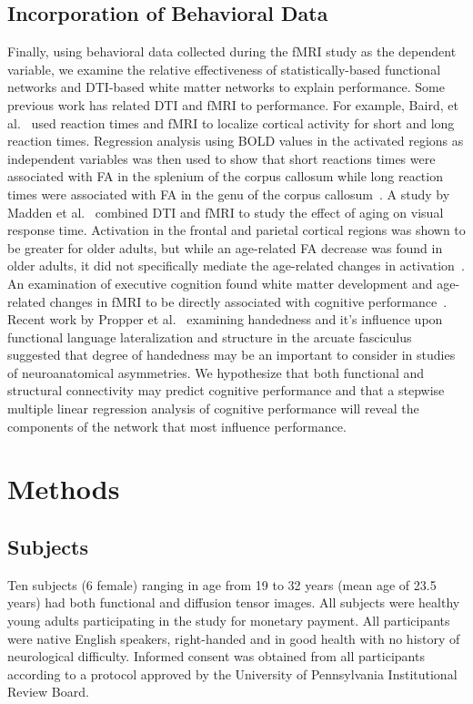 \subsection{Incorporation of Behavioral Data}
Finally, using behavioral data collected during the fMRI study as the dependent variable, we examine the relative effectiveness of statistically-based functional networks and DTI-based white matter networks to explain performance. Some previous work has related DTI and fMRI to performance. For example, Baird, et al.\ \cite{Baird2005} used reaction times and fMRI to localize cortical activity for short and long reaction times. Regression analysis using BOLD values in the activated regions as independent variables was then used to show that short reactions times were associated with FA in the splenium of the corpus callosum while long reaction times were associated with FA in the genu of the corpus callosum~\cite{Baird2005}. A study by Madden et al.\ \cite{Madden2007} combined DTI and fMRI to study the effect of aging on visual response time. Activation in the frontal and parietal cortical regions was shown to be greater for older adults, but while an age-related FA decrease was found in older adults, it did not specifically mediate the age-related changes in activation~\cite{Madden2007}. An examination of executive cognition found white matter development and age-related changes in fMRI to be directly associated with cognitive performance~\cite{Stevens2009}. Recent work by Propper et al.\ \cite{Propper2010} examining handedness and it's influence upon functional language lateralization and structure in the arcuate fasciculus suggested that degree of handedness may be an important to consider in studies of neuroanatomical asymmetries.  We hypothesize that both functional and structural connectivity may predict cognitive performance and that a stepwise multiple linear regression analysis of cognitive performance will reveal the components of the network that most influence performance. 

\section{Methods}

\subsection{Subjects}
Ten subjects (6 female) ranging in age from 19 to 32 years (mean age of 23.5 years) had both functional and diffusion tensor images. All subjects were healthy young adults participating in the study for monetary payment. All participants were native English speakers, right-handed and in good health with no history of neurological difficulty. Informed consent was obtained from all participants according to a protocol approved by the University of Pennsylvania Institutional Review Board. 

